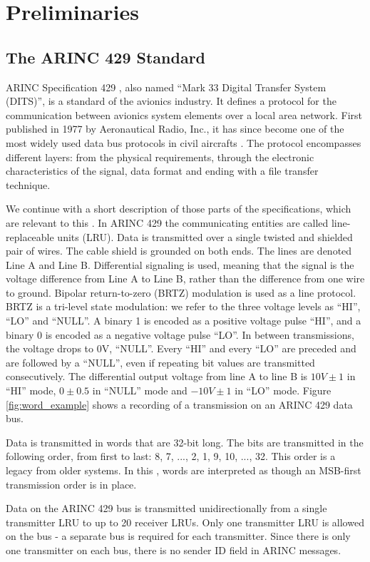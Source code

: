\documentclass[compsoc,conference,a4paper]{IEEEtran}
\newcommand{\level}[1]{\section{#1}}
\newcommand{\sublevel}[1]{\subsection{#1}}
\newcommand{\level}[1]{\chapter{#1}}
\newcommand{\sublevel}[1]{\section{#1}}
\begin{document}
\level{Preliminaries} \label{Preliminaries}
\sublevel{The ARINC 429 Standard}
  ARINC Specification 429 \cite{arinc2004arinc429}, also named ``Mark 33 Digital Transfer System (DITS)'', is a standard of the avionics industry. It defines a protocol for the communication between avionics system elements over a local area network. First published in 1977 by Aeronautical Radio, Inc., it has since become one of the most widely used data bus protocols in civil aircrafts \cite{MoirIan2013DBN}. The protocol encompasses different layers: from the physical requirements, through the electronic characteristics of the signal, data format and ending with a file transfer technique.

  We continue with a short description of those parts of the specifications, which are relevant to this \iftoggle{paper} {paper} {work}. In ARINC 429 the communicating entities are called line-replaceable units (LRU). Data is transmitted over a single twisted and shielded pair of wires. The cable shield is grounded on both ends. The lines are denoted Line A and Line B. Differential signaling is used, meaning that the signal is the voltage difference from Line A to Line B, rather than the difference from one wire to ground. Bipolar return-to-zero (BRTZ) modulation is used as a line protocol. BRTZ is a tri-level state modulation: we refer to the three voltage levels as ``HI'', ``LO'' and ``NULL''. A binary 1 is encoded as a positive voltage pulse ``HI'', and a binary 0 is encoded as a negative voltage pulse ``LO''. In between transmissions, the voltage drops to 0V, ``NULL''. Every ``HI'' and every ``LO'' are preceded and are followed by a ``NULL'', even if repeating bit values are transmitted consecutively. The differential output voltage from line A to line B is $10V \pm 1$ in ``HI'' mode, $0 \pm 0.5$ in ``NULL'' mode and $-10V \pm 1$ in ``LO'' mode.  Figure \ref{fig:word_example} shows a recording of a transmission on an ARINC 429 data bus.
  
  Data is transmitted in words that are 32-bit long. The bits are transmitted in the following order, from first to last: 8, 7, ..., 2, 1, 9, 10, ..., 32. This order is a legacy from older systems. In this \iftoggle{paper} {paper} {work}, words are interpreted as though an MSB-first transmission order is in place.
  
  Data on the ARINC 429 bus is transmitted unidirectionally from a single transmitter LRU to up to 20 receiver LRUs. Only one transmitter LRU is allowed on the bus - a separate bus is required for each transmitter. Since there is only one transmitter on each bus, there is no sender ID field in ARINC messages.
   
\end{document}
